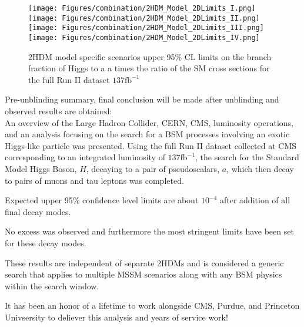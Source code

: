 \begin{figure}[ht!b]
  \centering
  \texttt{[image: Figures/combination/2HDM\_Model\_2DLimits\_I.png]}
  \texttt{[image: Figures/combination/2HDM\_Model\_2DLimits\_II.png]}\\
  \texttt{[image: Figures/combination/2HDM\_Model\_2DLimits\_III.png]}
  \texttt{[image: Figures/combination/2HDM\_Model\_2DLimits\_IV.png]}\\
    \caption{\label{fig:2HDM} 2HDM model specific scenarios upper 95\% CL limits on the branch fraction of Higgs to a a times the ratio of the SM cross sections for the full Run II dataset $\text{137}\text{fb}^{-1}$ }
\end{figure}

\clearpage

Pre-unblinding summary, final conclusion will be made after unblinding and observed results are obtained: \\



An overview of the Large Hadron Collider, CERN, CMS, luminosity operations, and an analysis focusing on the search for a BSM processes involving an exotic Higgs-like particle was presented.
Using the full Run II dataset collected at CMS corresponding to an integrated luminosity of $\text{137}\text{fb}^{-1}$, the search for the Standard Model Higgs Boson, $H$, decaying to a pair of pseudoscalars, $a$, which then decay to pairs of muons and tau leptons was completed. 

Expected upper 95\% confidence level limits are about $10^{-4}$ after addition of all final decay modes. 


No excess was observed and furthermore the most stringent limits have been set for these decay modes. 


These results are independent of separate 2HDMs and is considered a generic search that applies to multiple MSSM scenarios along with any BSM physics within the search window. 

It has been an honor of a lifetime to work alongside CMS, Purdue, and Princeton Univsersity to deliever this analysis and years of service work! 
